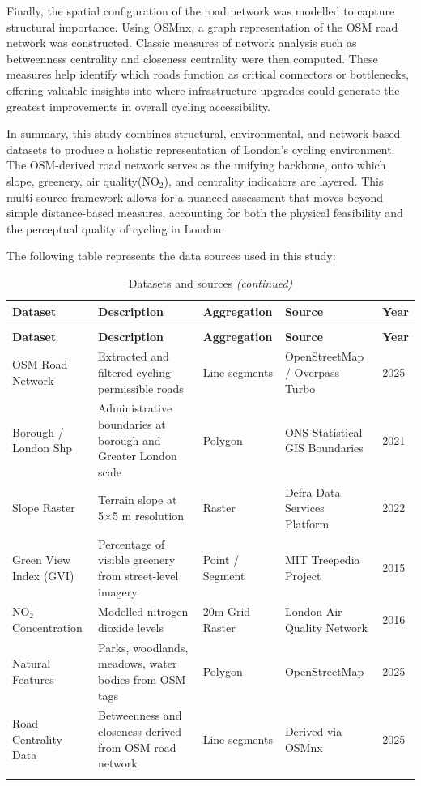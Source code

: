 \documentclass[
  12pt,
  oneside]{book}
\begin{document}
Finally, the spatial configuration of the road network was modelled to capture structural importance. Using OSMnx, a graph representation of the OSM road network was constructed. Classic measures of network analysis such as betweenness centrality and closeness centrality were then computed. These measures help identify which roads function as critical connectors or bottlenecks, offering valuable insights into where infrastructure upgrades could generate the greatest improvements in overall cycling accessibility.

In summary, this study combines structural, environmental, and network-based datasets to produce a holistic representation of London's cycling environment. The OSM-derived road network serves as the unifying backbone, onto which slope, greenery, air quality(NO\(_2\)), and centrality indicators are layered. This multi-source framework allows for a nuanced assessment that moves beyond simple distance-based measures, accounting for both the physical feasibility and the perceptual quality of cycling in London.

The following table represents the data sources used in this study:

\begingroup\fontsize{9}{11}\selectfont

\begin{longtable}[t]{>{\raggedright\arraybackslash}p{2.0cm}>{\raggedright\arraybackslash}p{5.0cm}>{\raggedright\arraybackslash}p{2.2cm}>{\raggedright\arraybackslash}p{2.2cm}l}
\caption{\label{tab:datasource}Datasets and sources}\\
\toprule
\textbf{Dataset} & \textbf{Description} & \textbf{Aggregation} & \textbf{Source} & \textbf{Year}\\
\midrule
\endfirsthead
\caption[]{\label{tab:datasource}Datasets and sources \textit{(continued)}}\\
\toprule
\textbf{Dataset} & \textbf{Description} & \textbf{Aggregation} & \textbf{Source} & \textbf{Year}\\
\midrule
\endhead

\endfoot
\bottomrule
\endlastfoot
OSM Road Network & Extracted and filtered cycling-permissible roads & Line segments & OpenStreetMap / Overpass Turbo & 2025\\
Borough / London Shp & Administrative boundaries at borough and Greater London scale & Polygon & ONS Statistical GIS Boundaries & 2021\\
Slope Raster & Terrain slope at 5×5 m resolution & Raster & Defra Data Services Platform & 2022\\
Green View Index (GVI) & Percentage of visible greenery from street-level imagery & Point / Segment & MIT Treepedia Project & 2015\\
NO₂ Concentration & Modelled nitrogen dioxide levels & 20m Grid Raster & London Air Quality Network & 2016\\
\addlinespace
Natural Features & Parks, woodlands, meadows, water bodies from OSM tags & Polygon & OpenStreetMap & 2025\\
Road Centrality Data & Betweenness and closeness derived from OSM road network & Line segments & Derived via OSMnx & 2025\\*
\end{longtable}
\endgroup{}
\end{document}
